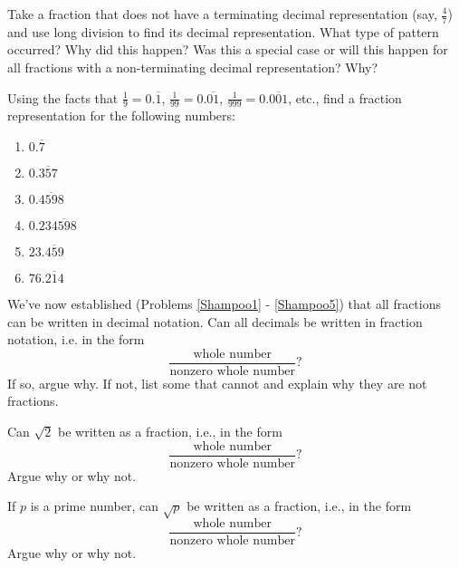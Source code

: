 \documentclass{ximera}
\begin{document}
\begin{problem} \label{Shampoo4}
Take a fraction that does not have a terminating decimal
representation (say, $\frac{4}{7}$) and use long division to find its
decimal representation.  What type of pattern occurred?  Why did this
happen?  Was this a special case or will this happen for all fractions
with a non-terminating decimal representation?  Why?

\end{problem}

\begin{problem}\label{Shampoo5}
Using the facts that $\frac{1}{9}=0.\overline{1}$,
$\frac{1}{99}=0.\overline{01}$, $\frac{1}{999}=0.\overline{001}$,
etc., find a fraction representation for the following numbers:

\begin{enumerate}
\item $0.\overline{7}$
\item $0.\overline{357}$
\item $0.\overline{4598}$
\item $0.23\overline{4598}$
\item $23.\overline{459}$
\item $76.\overline{214}$
\end{enumerate}


\end{problem}

\begin{problem} \label{Shampoo6}
We've now established (Problems \ref{Shampoo1} - \ref{Shampoo5}) that all fractions can be written in
decimal notation.  Can all decimals be written in fraction notation,
i.e. in the form \[ \frac{\text{whole number}}{\text{nonzero whole
    number}}?\] If so, argue why.  If not, list some that cannot and
explain why they are not fractions.

\end{problem}

\begin{problem}\label{Shampoo7}
Can $\sqrt{2}$ be written as a fraction, i.e., in the form 
\[ 
\frac{\text{whole number}}{\text{nonzero whole number}}?
\] 
Argue why or why not. 


\end{problem}

\begin{problem}\label{Shampoo8}
If $p$ is a prime number, can $\sqrt{p}$ be written as a fraction,
i.e., in the form 
\[ 
\frac{\text{whole number}}{\text{nonzero whole number}}?
\] 
Argue why or why not.
\end{problem} 
\end{document}
